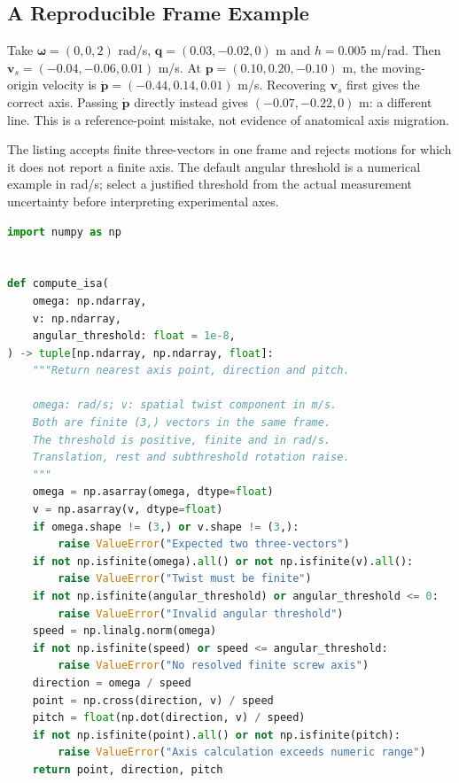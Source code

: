 \subsection{A Reproducible Frame Example}

Take $\bm\omega=(0,0,2)$ rad/s, $\bm q=(0.03,-0.02,0)$ m and
$h=0.005$ m/rad. Then $\bm v_s=(-0.04,-0.06,0.01)$ m/s. At
$\bm p=(0.10,0.20,-0.10)$ m, the moving-origin velocity is
$\dot{\bm p}=(-0.44,0.14,0.01)$ m/s. Recovering $\bm v_s$ first gives the
correct axis. Passing $\dot{\bm p}$ directly instead gives
$(-0.07,-0.22,0)$ m: a different line. This is a reference-point mistake,
not evidence of anatomical axis migration.

The listing accepts finite three-vectors in one frame and rejects motions for
which it does not report a finite axis. The default angular threshold is a
numerical example in rad/s; select a justified threshold from the actual
measurement uncertainty before interpreting experimental axes.

\begin{lstlisting}[language=Python, caption={Finite Screw Axis From a Declared Spatial Twist}]
import numpy as np


def compute_isa(
    omega: np.ndarray,
    v: np.ndarray,
    angular_threshold: float = 1e-8,
) -> tuple[np.ndarray, np.ndarray, float]:
    """Return nearest axis point, direction and pitch.

    omega: rad/s; v: spatial twist component in m/s.
    Both are finite (3,) vectors in the same frame.
    The threshold is positive, finite and in rad/s.
    Translation, rest and subthreshold rotation raise.
    """
    omega = np.asarray(omega, dtype=float)
    v = np.asarray(v, dtype=float)
    if omega.shape != (3,) or v.shape != (3,):
        raise ValueError("Expected two three-vectors")
    if not np.isfinite(omega).all() or not np.isfinite(v).all():
        raise ValueError("Twist must be finite")
    if not np.isfinite(angular_threshold) or angular_threshold <= 0:
        raise ValueError("Invalid angular threshold")
    speed = np.linalg.norm(omega)
    if not np.isfinite(speed) or speed <= angular_threshold:
        raise ValueError("No resolved finite screw axis")
    direction = omega / speed
    point = np.cross(direction, v) / speed
    pitch = float(np.dot(direction, v) / speed)
    if not np.isfinite(point).all() or not np.isfinite(pitch):
        raise ValueError("Axis calculation exceeds numeric range")
    return point, direction, pitch
\end{lstlisting}

